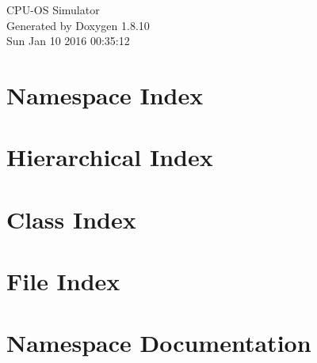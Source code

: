 \documentclass[twoside]{book}
\newcommand{\+}{\discretionary{\mbox{\scriptsize$\hookleftarrow$}}{}{}}
\newcommand{\clearemptydoublepage}{%
  \newpage{\pagestyle{empty}\cleardoublepage}%
}
\begin{document}
\hypersetup{pageanchor=false,
             bookmarks=true,
             bookmarksnumbered=true,
             pdfencoding=unicode
            }
\begin{titlepage}
\vspace*{7cm}
\begin{center}%
{\Large C\+P\+U-\/\+O\+S Simulator }\\
\vspace*{1cm}
{\large Generated by Doxygen 1.8.10}\\
\vspace*{0.5cm}
{\small Sun Jan 10 2016 00:35:12}\\
\end{center}
\end{titlepage}
\clearemptydoublepage
\tableofcontents
\clearemptydoublepage
{}
\hypersetup{pageanchor=true}

\chapter{Namespace Index}

\chapter{Hierarchical Index}

\chapter{Class Index}

\chapter{File Index}

\chapter{Namespace Documentation}


















\end{document}
